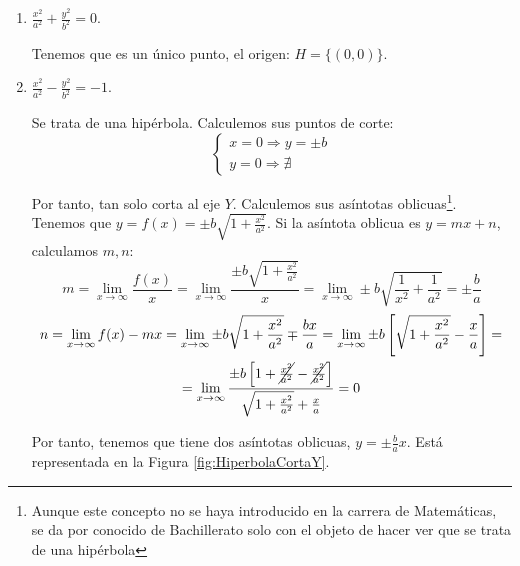 \begin{enumerate}
    \item $\displaystyle \frac{x^2}{a^2} + \frac{y^2}{b^2} = 0$.

    Tenemos que es un único punto, el origen: $H=\{(0,0)\}$.
    
    \item $\displaystyle \frac{x^2}{a^2} - \frac{y^2}{b^2} = -1$.

    Se trata de una hipérbola. Calculemos sus puntos de corte:
    \begin{equation*}
        \left\{\begin{array}{l}
            x=0 \Longrightarrow y=\pm b  \\
            y=0 \Longrightarrow \nexists
        \end{array}\right.
    \end{equation*}

    Por tanto, tan solo corta al eje $Y$. Calculemos sus asíntotas oblicuas\footnote{Aunque este concepto no se haya introducido en la carrera de Matemáticas, se da por conocido de Bachillerato solo con el objeto de hacer ver que se trata de una hipérbola}. Tenemos que $y=f(x)=\pm b\sqrt{1+\frac{x^2}{a^2}}$. Si la asíntota oblicua es $y=mx+n$, calculamos $m,n$:
    \begin{equation*}
        m = \lim_{x\to \infty} \frac{f(x)}{x} = \lim_{x\to \infty} \frac{\pm b\sqrt{1+\frac{x^2}{a^2}}}{x}
        = \lim_{x\to \infty} \pm b\sqrt{\frac{1}{x^2}+\frac{1}{a^2}} = \pm \frac{b}{a}
    \end{equation*}
    \begin{multline*}
        n = \lim_{x\to \infty} f(x) -mx
        = \lim_{x\to \infty} \pm b\sqrt{1+\frac{x^2}{a^2}} \mp \frac{bx}{a} 
        = \lim_{x\to \infty} \pm b\left[\sqrt{1+\frac{x^2}{a^2}} - \frac{x}{a}\right]
        =\\= \lim_{x\to \infty} \dfrac{\pm b\left[{1+\cancel{\frac{x^2}{a^2}}} -\cancel{ \frac{x^2}{a^2}}\right]}{\sqrt{1+\frac{x^2}{a^2}} + \frac{x}{a}} = 0
    \end{multline*}

    Por tanto, tenemos que tiene dos asíntotas oblicuas, $y=\pm \frac{b}{a}x$. Está representada en la Figura \ref{fig:HiperbolaCortaY}.
    \begin{figure}
        \centering
\end{figure}
\end{enumerate}
